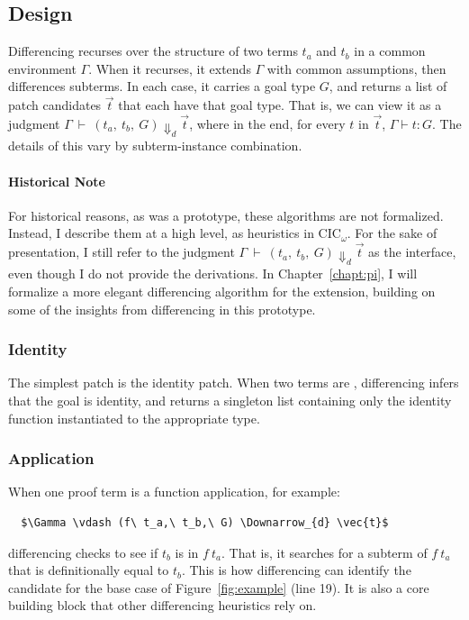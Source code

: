 \subsection{Design}
\label{sec:pumpkin-diff-design}


Differencing recurses over the structure of two terms $t_a$ and $t_b$ in a common environment $\Gamma$.
When it recurses, it extends $\Gamma$ with common assumptions, then differences subterms.
In each case, it carries a goal type $G$, and returns a list of patch candidates $\vec{t}$ that each have that goal type.
That is, we can view it as a judgment $\Gamma\ \vdash\ (t_a,\ t_b,\ G) \Downarrow_{d} \vec{t}$,
where in the end, for every $t$ in $\vec{t}$, $\Gamma \vdash t : G$.
The details of this vary by subterm-instance combination.

\paragraph{Historical Note}
For historical reasons, as \sysname was a prototype, these algorithms are not formalized.
Instead, I describe them at a high level, as heuristics in CIC$_{\omega}$.
For the sake of presentation, I still refer to the judgment $\Gamma\ \vdash\ (t_a,\ t_b,\ G) \Downarrow_{d} \vec{t}$ as the interface,
even though I do not provide the derivations.
In Chapter~\ref{chapt:pi}, I will formalize a more elegant differencing algorithm for the \toolnamec extension,
building on some of the insights from differencing in this prototype.

\subsubsection*{Identity}
The simplest patch is the identity patch.
When two terms are , %
differencing infers that the goal is identity,
and returns a singleton list containing only the identity function instantiated to the appropriate type.

\subsubsection*{Application}
When one proof term is a function application, for example:

\begin{lstlisting}
  $\Gamma \vdash (f\ t_a,\ t_b,\ G) \Downarrow_{d} \vec{t}$
\end{lstlisting}
differencing checks to see if $t_b$ is in $f\ t_a$.
That is, it searches for a subterm of $f\ t_a$ that is definitionally equal to $t_b$.
This is how differencing can identify the candidate for the base case of Figure~\ref{fig:example} (line 19).
It is also a core building block that other differencing heuristics rely on.

